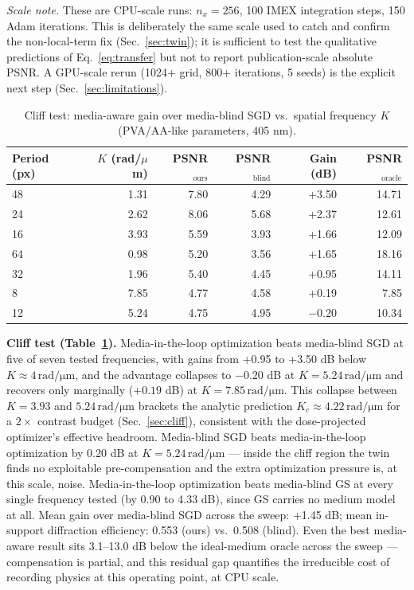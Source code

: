 \documentclass[conference]{IEEEtran}
\begin{document}
\emph{Scale note.} These are CPU-scale runs: $n_x = 256$, 100 IMEX
integration steps, 150 Adam iterations. This is deliberately the same scale
used to catch and confirm the non-local-term fix (Sec.~\ref{sec:twin}); it is
sufficient to test the qualitative predictions of Eq.~\ref{eq:transfer} but
not to report publication-scale absolute PSNR. A GPU-scale rerun
(1024+ grid, 800+ iterations, 5 seeds) is the explicit next step
(Sec.~\ref{sec:limitations}).

\begin{table}[t]
\centering
\caption{Cliff test: media-aware gain over media-blind SGD vs.\ spatial frequency $K$ (PVA/AA-like parameters, 405 nm).}
\label{tab:cliff}
\begin{tabular}{@{}lrrrrr@{}}
\toprule
Period (px) & $K$ (rad/$\mu$m) & PSNR$_\text{ours}$ & PSNR$_\text{blind}$ & Gain (dB) & PSNR$_\text{oracle}$ \\
\midrule
48 & 1.31 & 7.80 & 4.29 & +3.50 & 14.71 \\
24 & 2.62 & 8.06 & 5.68 & +2.37 & 12.61 \\
16 & 3.93 & 5.59 & 3.93 & +1.66 & 12.09 \\
64 & 0.98 & 5.20 & 3.56 & +1.65 & 18.16 \\
32 & 1.96 & 5.40 & 4.45 & +0.95 & 14.11 \\
8  & 7.85 & 4.77 & 4.58 & +0.19 & 7.85 \\
12 & 5.24 & 4.75 & 4.95 & $-$0.20 & 10.34 \\
\bottomrule
\end{tabular}
\end{table}

\textbf{Cliff test (Table~\ref{tab:cliff}).} Media-in-the-loop optimization
beats media-blind SGD at five of seven tested frequencies, with gains from
+0.95 to +3.50 dB below $K \approx 4\,\mathrm{rad/\mu m}$, and the advantage
collapses to $-0.20$ dB at $K = 5.24\,\mathrm{rad/\mu m}$ and recovers only
marginally ($+0.19$ dB) at $K = 7.85\,\mathrm{rad/\mu m}$. This collapse
between $K = 3.93$ and $5.24\,\mathrm{rad/\mu m}$ brackets the analytic
prediction $K_c \approx 4.22\,\mathrm{rad/\mu m}$ for a $2\times$ contrast
budget (Sec.~\ref{sec:cliff}), consistent with the dose-projected optimizer's
effective headroom. Media-blind SGD beats media-in-the-loop optimization by
0.20 dB at $K=5.24\,\mathrm{rad/\mu m}$ — inside the cliff region the twin
finds no exploitable pre-compensation and the extra optimization pressure is,
at this scale, noise. Media-in-the-loop optimization beats media-blind GS at
every single frequency tested (by 0.90 to 4.33 dB), since GS carries no
medium model at all. Mean gain over media-blind SGD across the sweep: +1.45
dB; mean in-support diffraction efficiency: 0.553 (ours) vs.\ 0.508 (blind).
Even the best media-aware result sits 3.1--13.0 dB below the ideal-medium
oracle across the sweep — compensation is partial, and this residual gap
quantifies the irreducible cost of recording physics at this operating
point, at CPU scale.
\end{document}
